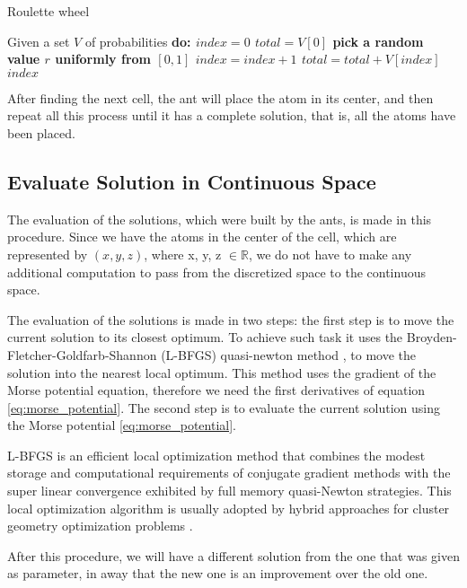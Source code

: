 			\begin{algorithm}
				\caption{Roulette wheel}
				\label{alg:roulette_wheel}
				\begin{algorithmic}
				\STATE Given a set $V$ of probabilities \bf{do}:
				\STATE $index = 0$
				\STATE $total = V[0]$
				\STATE pick a random value $r$ uniformly from $[0,1]$
					\STATE $index = index + 1$
					\STATE $total = total + V[index]$		
				\ENDWHILE
				\RETURN $index$
				\end{algorithmic}
			\end{algorithm}
			
			After finding the next cell, the ant will place the atom in its center, and then repeat all this process until it has a complete solution, that is, all the atoms have been placed.
			
			\subsection{Evaluate Solution in Continuous Space}
			
			The evaluation of the solutions, which were built by the ants, is made in this procedure. Since we have the atoms in the center of the cell, which are represented by $(x,y,z)$, where x, y, z $\in \mathbb{R}$, we do not have to make any additional computation to pass from the discretized space to the continuous space.

			The evaluation of the solutions is made in two steps: the first step is to move the current solution to its closest optimum. To achieve such task it uses the Broyden-Fletcher-Goldfarb-Shannon (L-BFGS) quasi-newton method \cite{liu89}, to move the solution into the nearest local optimum. This method uses the gradient of the Morse potential equation, therefore we need the first derivatives of equation \ref{eq:morse_potential}. The second step is to evaluate the current solution using the Morse potential \ref{eq:morse_potential}.

			L-BFGS is an efficient local optimization method that combines the modest storage and computational requirements of conjugate gradient methods with the super linear convergence exhibited by full memory quasi-Newton strategies. This local optimization algorithm is usually adopted by hybrid approaches for cluster geometry optimization problems \cite{grosso07, xico09}.

			After this procedure, we will have a different solution from the one that was given as parameter, in away that the new one is an improvement over the old one.
			
